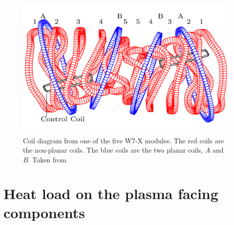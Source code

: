 \begin{figure}[!htb]
    \centering
    \includegraphics[scale = 0.7]{images/magnetic-coils.png}
    \caption{Coil diagram from one of the five W7-X modules. The red coils are the non-planar coils. The blue coils are the two planar coils, $A$ and $B$. Taken from \cites{Böckenhoff_2018}} \label{fig:3}
\end{figure}


\section{Heat load on the plasma facing components}

